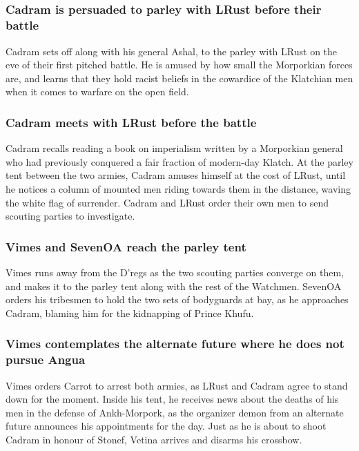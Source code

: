 \subsection{}
\subsubsection{\Gls{Cadram} is persuaded to parley with \Gls{LRust} before their battle}
\Gls{Cadram} sets off along with his general \Gls{Ashal}, to the parley with \Gls{LRust} on the
eve of their first pitched battle. He is amused by how small the Morporkian forces are, and learns
that they hold racist beliefs in the cowardice of the Klatchian men when it comes to warfare on the
open field.

\subsubsection{\Gls{Cadram} meets with \Gls{LRust} before the battle}
\Gls{Cadram} recalls reading a book on imperialism written by a Morporkian general who had
previously conquered a fair fraction of modern-day Klatch. At the parley tent between the two
armies, \Gls{Cadram} amuses himself at the cost of \Gls{LRust}, until he notices a column of
mounted men riding towards them in the distance, waving the white flag of surrender. \Gls{Cadram}
and \Gls{LRust} order their own men to send scouting parties to investigate.

\subsubsection{\Gls{Vimes} and \Gls{SevenOA} reach the parley tent}
\Gls{Vimes} runs away from the D'regs as the two scouting parties converge on them, and makes it
to the parley tent along with the rest of the Watchmen. \Gls{SevenOA} orders his tribesmen to hold
the two sets of bodyguards at bay, as he approaches \Gls{Cadram}, blaming him for the kidnapping of
Prince \Gls{Khufu}.

\subsubsection{\Gls{Vimes} contemplates the alternate future where he does not pursue \Gls{Angua}}
\Gls{Vimes} orders \Gls{Carrot} to arrest both armies, as \Gls{LRust} and \Gls{Cadram} agree to
stand down for the moment. Inside his tent, he receives news about the deaths of his men in the
defense of Ankh-Morpork, as the organizer demon from an alternate future announces his appointments
for the day. Just as he is about to shoot \Gls{Cadram} in honour of \Gls{Stonef}, \Gls{Vetina}
arrives and disarms his crossbow.

